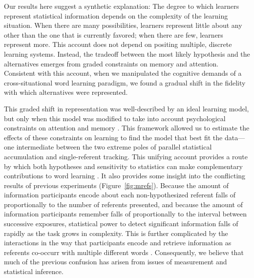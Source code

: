 \documentclass[man,floatsintext]{apa6}
\begin{document}
Our results here suggest a synthetic explanation: The degree to which learners represent statistical information depends on the complexity of the learning situation. When there are many possibilities, learners represent little about any other than the one that is currently favored; when there are few, learners represent more. This account does not depend on positing multiple, discrete learning systems. Instead, the tradeoff between the most likely hypothesis and the alternatives emerges from graded constraints on memory and attention. Consistent with this account, when we manipulated the cognitive demands of a cross-situational word learning paradigm, we found a gradual shift in the fidelity with which alternatives were represented.

This graded shift in representation was well-described by an ideal learning model, but only when this model was modified to take into account psychological constraints on attention and memory \cite{Kachergis2012,Vlach2013,Yurovsky2014}. This framework allowed us to estimate the effects of these constraints on learning to find the model that best fit the data---one intermediate between the two extreme poles of parallel statistical accumulation and single-referent tracking. This unifying account provides a route by which both hypotheses and sensitivity to statistics can make complementary contributions to word learning \cite{Waxman2009,Kachergis2013}. It also provides some insight into the conflicting results of previous experiments (Figure~\ref{fig:mrefs}). Because the amount of information participants encode about each non-hypothesized referent falls of proportionally to the number of referents presented, and because the amount of information participants remember falls of proportionally to the interval between successive exposures, statistical power to detect significant information falls of rapidly as the task grows in complexity. This is further complicated by the interactions in the way that participants encode and retrieve information as referents co-occurr with multiple different words \cite{Yurovsky2013, Yurovsky2014}. Consequently, we believe that much of the previous confusion has arisen from issues of measurement and statistical inference.
\end{document}
